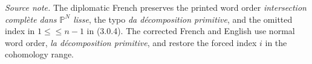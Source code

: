 \medskip
\noindent\emph{Source note.}
The diplomatic French preserves the printed word order
\emph{intersection complète dans $\mathbb P^N$ lisse}, the typo
\emph{da décomposition primitive}, and the omitted index in
$1\leq{}\leq n-1$ in (3.0.4).  The corrected French and English use normal
word order, \emph{la décomposition primitive}, and restore the forced index
$i$ in the cohomology range.
